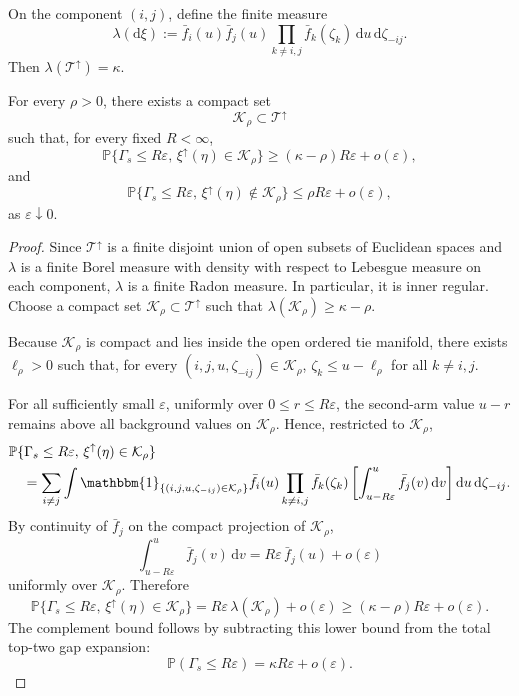 \documentclass[10pt]{article}
\newcommand{\dd}{\mathrm{d}}
\theoremstyle{plain}
\begin{document}
On the component \((i,j)\), define the finite measure
\[
    \lambda(\dd\xi)
    :=
    \bar f_i(u)\bar f_j(u)
    \prod_{k\neq i,j}\bar f_k(\zeta_k)\,\dd u\,\dd \zeta_{-ij}.
\]
Then
    $\lambda(\mathcal T^\uparrow)=\kappa$.


\begin{lemma}
\label{lem:compact-localization-simple-upper}
For every \(\rho>0\), there exists a compact set
\[
    \mathcal K_\rho\subset\mathcal T^\uparrow
\]
such that, for every fixed \(R<\infty\),
\[
    \mathbb P\{\Gamma_s\le R\varepsilon,\,
    \xi^\uparrow(\eta)\in\mathcal K_\rho\}
    \ge
    (\kappa-\rho)R\varepsilon+o(\varepsilon),
\]
and
\[
    \mathbb P\{\Gamma_s\le R\varepsilon,\,
    \xi^\uparrow(\eta)\notin\mathcal K_\rho\}
    \le
    \rho R\varepsilon+o(\varepsilon),
\]
as \(\varepsilon\downarrow0\).
\end{lemma}

\begin{proof}
Since \(\mathcal T^\uparrow\) is a finite disjoint union of open subsets of
Euclidean spaces and \(\lambda\) is a finite Borel measure with density with
respect to Lebesgue measure on each component, \(\lambda\) is a finite Radon
measure.  In particular, it is inner regular.  Choose a compact set $\mathcal K_\rho\subset\mathcal T^\uparrow$
such that $\lambda(\mathcal K_\rho)\ge \kappa-\rho$.

Because \(\mathcal K_\rho\) is compact and lies inside the open ordered tie
manifold, there exists \(\ell_\rho>0\) such that, for every
\((i,j,u,\zeta_{-ij})\in\mathcal K_\rho\), $ \zeta_k\le u-\ell_\rho$ for all $k\neq i,j$.

For all sufficiently small \(\varepsilon\), uniformly over
\(0\le r\le R\varepsilon\), the second-arm value \(u-r\) remains above all
background values on \(\mathcal K_\rho\).  Hence, restricted to
\(\mathcal K_\rho\),
\[
\begin{aligned}
    &\mathbb P\{\Gamma_s\le R\varepsilon,\,
    \xi^\uparrow(\eta)\in\mathcal K_\rho\}                         \\
    &\quad=
    \sum_{i\neq j}
    \int
        \mathbbm{1}_{\{(i,j,u,\zeta_{-ij})\in\mathcal K_\rho\}}
        \bar f_i(u)
        \prod_{k\neq i,j}\bar f_k(\zeta_k)
        \left[
            \int_{u-R\varepsilon}^{u}\bar f_j(v)\,\dd v
        \right]
    \dd u\,\dd \zeta_{-ij}.
\end{aligned}
\]
By continuity of \(\bar f_j\) on the compact projection of
\(\mathcal K_\rho\),
\[
    \int_{u-R\varepsilon}^{u}\bar f_j(v)\,\dd v
    =
    R\varepsilon\,\bar f_j(u)+o(\varepsilon)
\]
uniformly over \(\mathcal K_\rho\).  Therefore
\[
    \mathbb P\{\Gamma_s\le R\varepsilon,\,
    \xi^\uparrow(\eta)\in\mathcal K_\rho\}
    =
    R\varepsilon\,\lambda(\mathcal K_\rho)+o(\varepsilon)
    \ge
    (\kappa-\rho)R\varepsilon+o(\varepsilon).
\]
The complement bound follows by subtracting this lower bound from the total
top-two gap expansion:
\[
    \mathbb P(\Gamma_s\le R\varepsilon)
    =
    \kappa R\varepsilon+o(\varepsilon). 
\]

\end{proof}
\end{document}
